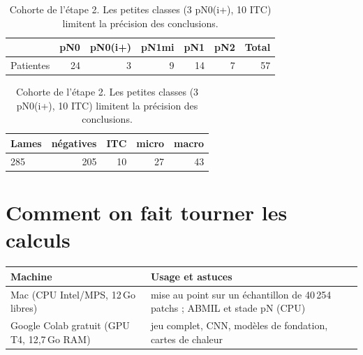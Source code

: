 \documentclass[11pt,a4paper]{article}
\begin{document}
\begin{table}[H]
\centering
\begin{tabular}{lrrrrr|r}
\toprule
& pN0 & pN0(i+) & pN1mi & pN1 & pN2 & Total \\
\midrule
Patientes & 24 & 3 & 9 & 14 & 7 & 57 \\
\bottomrule
\end{tabular}
\quad
\begin{tabular}{lrrrr}
\toprule
Lames & négatives & ITC & micro & macro \\
\midrule
285 & 205 & 10 & 27 & 43 \\
\bottomrule
\end{tabular}
\caption{Cohorte de l'étape 2. Les petites classes (3 pN0(i+), 10 ITC) limitent la précision des conclusions.}
\end{table}

\section{Comment on fait tourner les calculs}

\begin{table}[H]
\centering
\begin{tabularx}{\textwidth}{lX}
\toprule
\textbf{Machine} & \textbf{Usage et astuces} \\
\midrule
Mac (CPU Intel/MPS, 12\,Go libres) & mise au point sur un échantillon de 40\,254 patchs ; ABMIL et stade pN (CPU) \\
Google Colab gratuit (GPU T4, 12,7\,Go RAM) & jeu complet, CNN, modèles de fondation, cartes de chaleur \\
\bottomrule
\end{tabularx}
\end{table}
\end{document}
